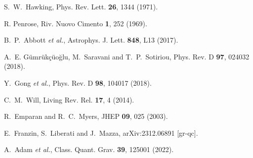 \documentclass[preprint,aps,tightenlines,showkeys,nofootinbib,superscriptaddress]{revtex4}
\begin{document}
\begin{thebibliography}{999}
S.~W.~Hawking,
Phys. Rev. Lett. \textbf{26}, 1344
(1971).

 R. Penrose, Riv. Nuovo Cimento {\bf 1},
252 (1969).

B.~P.~Abbott \textit{et al.},
Astrophys. J. Lett. \textbf{848},
L13 (2017).

A.~E.
G\"umr\"uk\c{c}\"uo\u{g}lu, M.~Saravani and T.~P.~Sotiriou,
Phys. Rev. D \textbf{97},
024032 (2018).

Y.~Gong \textit{et al.},
Phys. Rev. D \textbf{98},
104017 (2018).

C.~M.~Will,
Living Rev. Rel. \textbf{17}, 4 (2014).

R.~Emparan and R.~C.~Myers,
JHEP \textbf{09}, 025 (2003).

E.~Franzin, S.~Liberati and J.~Mazza,
arXiv:2312.06891 [gr-qc].

A.~Adam \textit{et al.},
Class. Quant. Grav. \textbf{39},
125001 (2022).


\end{thebibliography}
\end{document}
